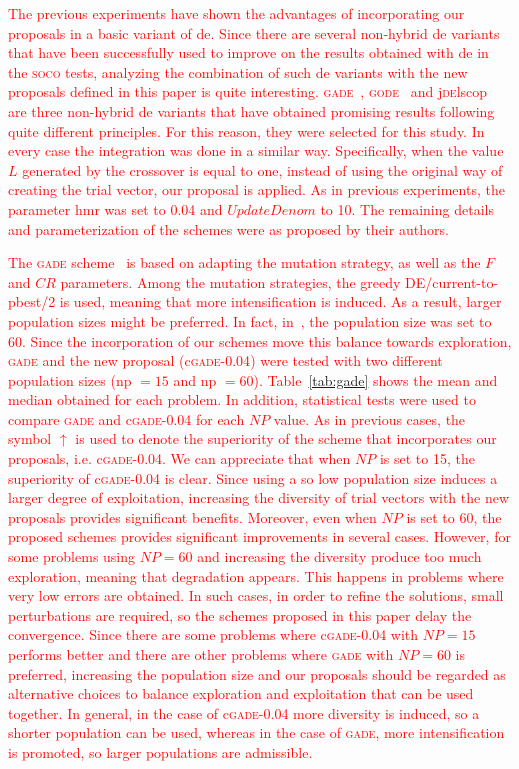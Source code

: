 \documentclass[review,3p]{elsarticle}
\newcommand{\DE}{{\sc de}}
\newcommand{\HMR}{{\sc hmr}}
\newcommand{\NP}{{\sc np}}
\begin{document}
\textcolor{red}{
The previous experiments have shown the advantages of incorporating our proposals in a basic
variant of \DE{}.
%
Since there are several non-hybrid \DE{} variants that have been successfully used to improve on the results obtained with \DE{} in the \textsc{soco} tests,
analyzing the combination of such \DE{} variants with the new proposals defined in this paper is quite interesting.
%
\textsc{gade}~\cite{Yang:11}, \textsc{gode}~\cite{Wang:11b} and j\textsc{de}lscop~\cite{Brest:11} are three non-hybrid \DE{} variants that have obtained promising results 
following quite different principles.
%
For this reason, they were selected for this study.
%
In every case the integration was done in a similar way.
%
Specifically, when the value $L$ generated by the crossover is equal to one, instead of using the original way of creating the trial vector,
our proposal is applied.
%
As in previous experiments, the parameter \HMR{} was set to 0.04 and $UpdateDenom$ to 10.
%
The remaining details and parameterization of the schemes were as proposed by their authors.
}

\textcolor{red}{
The \textsc{gade} scheme~\cite{Yang:11} is based on adapting the mutation strategy, as well as the $F$ and $CR$ parameters.
%
Among the mutation strategies, the greedy DE/current-to-pbest/2 is used, meaning that more intensification is induced.
%
As a result, larger population sizes might be preferred. 
%
In fact, in~\cite{Yang:11}, the population size was set to 60.
%
Since the incorporation of our schemes move this balance towards exploration, \textsc{gade} and the new proposal (c\textsc{gade-0.04})
were tested with two different population sizes (\NP{} $= 15$ and \NP{} $= 60$).
%
Table~\ref{tab:gade} shows the mean and median obtained for each problem.
%
In addition, statistical tests were used to compare \textsc{gade} and c\textsc{gade-0.04} for each $NP$ value.
%
As in previous cases, the symbol $\uparrow$ is used to denote the superiority of the scheme that incorporates our proposals, i.e. c\textsc{gade-0.04}.
%
We can appreciate that when $NP$ is set to 15, the superiority of c\textsc{gade-0.04} is clear.
%
Since using a so low population size induces a larger degree of exploitation, increasing the diversity of trial vectors with the new proposals provides significant benefits.
%
Moreover, even when $NP$ is set to 60, the proposed schemes provides significant improvements in several cases.
%
However, for some problems using $NP = 60$ and increasing the diversity produce too much exploration, meaning that degradation appears.
%
This happens in problems where very low errors are obtained.
%
In such cases, in order to refine the solutions, small perturbations are required, so the schemes proposed in this paper delay the convergence.
%
Since there are some problems where c\textsc{gade-0.04} with $NP = 15$ performs better and there are other problems where \textsc{gade} with $NP = 60$ is preferred,
increasing the population size and our proposals should be regarded as alternative choices to balance exploration and exploitation that can be used together.
%
In general, in the case of c\textsc{gade-0.04} more diversity is induced, so a shorter population can be used, whereas in the case of \textsc{gade}, more intensification is promoted, so
larger populations are admissible.
}
\end{document}
